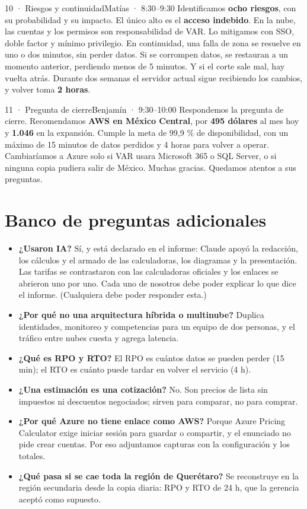 \documentclass[11pt]{article}
\begin{document}
\begin{lamina}{10 · Riesgos y continuidad}{Matías · 8:30--9:30}
Identificamos \textbf{ocho riesgos}, con su probabilidad y su impacto. El único alto es el \textbf{acceso indebido}. En la nube, las cuentas y los permisos son responsabilidad de VAR. Lo mitigamos con SSO, doble factor y mínimo privilegio. En continuidad, una falla de zona se resuelve en uno o dos minutos, sin perder datos. Si se corrompen datos, se restauran a un momento anterior, perdiendo menos de 5 minutos. Y si el corte sale mal, hay vuelta atrás. Durante dos semanas el servidor actual sigue recibiendo los cambios, y volver toma \textbf{2 horas}.
\end{lamina}

\begin{lamina}{11 · Pregunta de cierre}{Benjamín · 9:30--10:00}
Respondemos la pregunta de cierre. Recomendamos \textbf{AWS en México Central}, por \textbf{495 dólares} al mes hoy y \textbf{1.046} en la expansión. Cumple la meta de 99,9 \% de disponibilidad, con un máximo de 15 minutos de datos perdidos y 4 horas para volver a operar. Cambiaríamos a Azure solo si VAR usara Microsoft 365 o SQL Server, o si ninguna copia pudiera salir de México. Muchas gracias. Quedamos atentos a sus preguntas.
\end{lamina}

\section*{\sffamily\color{navy}\large Banco de preguntas adicionales}
\begin{itemize}[leftmargin=1.5em,itemsep=2pt]
  \item \textbf{¿Usaron IA?} Sí, y está declarado en el informe: Claude apoyó la redacción, los cálculos y el armado de las calculadoras, los diagramas y la presentación. Las tarifas se contrastaron con las calculadoras oficiales y los enlaces se abrieron uno por uno. Cada uno de nosotros debe poder explicar lo que dice el informe. (Cualquiera debe poder responder esta.)
  \item \textbf{¿Por qué no una arquitectura híbrida o multinube?} Duplica identidades, monitoreo y competencias para un equipo de dos personas, y el tráfico entre nubes cuesta y agrega latencia.
  \item \textbf{¿Qué es RPO y RTO?} El RPO es cuántos datos se pueden perder (15 min); el RTO es cuánto puede tardar en volver el servicio (4 h).
  \item \textbf{¿Una estimación es una cotización?} No. Son precios de lista sin impuestos ni descuentos negociados; sirven para comparar, no para comprar.
  \item \textbf{¿Por qué Azure no tiene enlace como AWS?} Porque Azure Pricing Calculator exige iniciar sesión para guardar o compartir, y el enunciado no pide crear cuentas. Por eso adjuntamos capturas con la configuración y los totales.
  \item \textbf{¿Qué pasa si se cae toda la región de Querétaro?} Se reconstruye en la región secundaria desde la copia diaria: RPO y RTO de 24 h, que la gerencia aceptó como supuesto.
\end{itemize}
\end{document}
